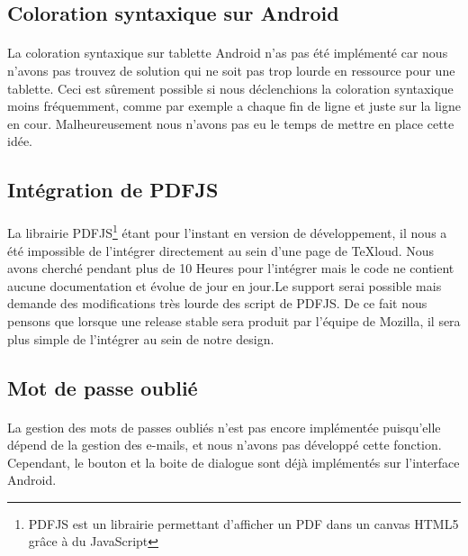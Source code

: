 \documentclass[a4paper,12pt]{article}
\begin{document}
\subsection{Coloration syntaxique sur Android}
\paragraph*{}
La coloration syntaxique sur tablette Android n'as pas été implémenté car nous n'avons pas trouvez de solution qui ne soit pas trop lourde en ressource pour une tablette. Ceci est sûrement possible si nous déclenchions la coloration syntaxique moins fréquemment, comme par exemple a chaque fin de ligne et juste sur la ligne en cour. Malheureusement nous n'avons pas eu le temps de mettre en place cette idée.

\subsection{Intégration de PDFJS}
\paragraph*{}
La librairie PDFJS\footnote{PDFJS est un librairie permettant d'afficher un PDF dans un canvas HTML5 grâce à du JavaScript} étant pour l'instant en version de développement, il nous a été impossible de l'intégrer directement au sein d'une page de TeXloud. Nous avons cherché pendant plus de 10 Heures pour l'intégrer mais le code ne contient aucune documentation et évolue de jour en jour.Le support serai possible mais demande des modifications très lourde des script de PDFJS. De ce fait nous pensons que lorsque une release stable sera produit par l'équipe de Mozilla, il sera plus simple de l'intégrer au sein de notre design.

\subsection{Mot de passe oublié}
\paragraph*{}
La gestion des mots de passes oubliés n'est pas encore implémentée puisqu'elle dépend de la gestion des e-mails, et nous n'avons pas développé cette fonction. Cependant, le bouton et la boite de dialogue sont déjà implémentés sur l'interface Android.

\newpage
\listoffigures
\end{document}
